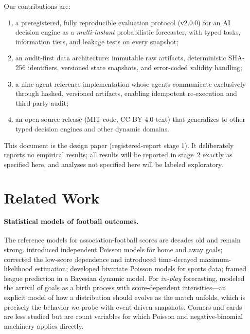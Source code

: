 \documentclass[11pt]{article}
\begin{document}
Our contributions are:
\begin{enumerate}[leftmargin=1.6em,itemsep=1pt]
  \item a preregistered, fully reproducible evaluation protocol (v2.0.0) for an
        AI decision engine as a \emph{multi-instant} probabilistic forecaster,
        with typed tasks, information tiers, and leakage tests on every
        snapshot;
  \item an audit-first data architecture: immutable raw artifacts, deterministic
        SHA-256 identifiers, versioned state snapshots, and error-coded
        validity handling;
  \item a nine-agent reference implementation whose agents communicate
        exclusively through hashed, versioned artifacts, enabling idempotent
        re-execution and third-party audit;
  \item an open-source release (MIT code, CC-BY 4.0 text) that generalizes to
        other typed decision engines and other dynamic domains.
\end{enumerate}

This document is the design paper (registered-report stage 1). It deliberately
reports no empirical results; all results will be reported in stage~2 exactly
as specified here, and analyses not specified here will be labeled exploratory.

\section{Related Work}
\label{sec:related}

\paragraph{Statistical models of football outcomes.}
The reference models for association-football scores are decades old and
remain strong. \citet{maher1982} introduced independent Poisson models for
home and away goals; \citet{dixon1997} corrected the low-score dependence and
introduced time-decayed maximum-likelihood estimation; \citet{karlis2003}
developed bivariate Poisson models for sports data; \citet{rue2000} framed
league prediction in a Bayesian dynamic model. For \emph{in-play} forecasting,
\citet{dixon1998} modeled the arrival of goals as a birth process with
score-dependent intensities---an explicit model of how a distribution should
evolve as the match unfolds, which is precisely the behavior we probe with
event-driven snapshots. Corners and cards are less studied but are count
variables for which Poisson and negative-binomial machinery applies directly.
\end{document}

